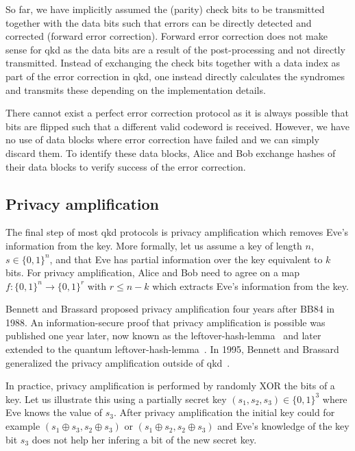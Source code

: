 So far, we have implicitly assumed the (parity) check bits to be transmitted together with the data bits such that errors can be directly detected and corrected (forward error correction).
Forward error correction does not make sense for \gls{qkd} as the data bits are a result of the post-processing and not directly transmitted.
Instead of exchanging the check bits together with a data index as part of the error correction in \gls{qkd}, one instead directly calculates the syndromes and transmits these depending on the implementation details.

There cannot exist a perfect error correction protocol as it is always possible that bits are flipped such that a different valid codeword is received.
However, we have no use of data blocks where error correction have failed and we can simply discard them.
To identify these data blocks, Alice and Bob exchange hashes of their data blocks to verify success of the error correction.

\FloatBarrier
\subsection{Privacy amplification}

The final step of most \gls{qkd} protocols is privacy amplification which removes Eve's information from the key.
More formally, let us assume a key of length $n$, $s\in\{0,1\}^n$, and that Eve has partial information over the key equivalent to $k$ bits.
For privacy amplification, Alice and Bob need to agree on a map $f\colon\{0,1\}^n\to\{0,1\}^r$ with $r\leq n-k$ which extracts Eve's information from the key.

Bennett and Brassard proposed privacy amplification four years after BB84 in 1988.
An information-secure proof that privacy amplification is possible was published one year later, now known as the leftover-hash-lemma~\cite{Impagliazzo1989} and later extended to the quantum leftover-hash-lemma~\cite{Renner2005}.
In 1995, Bennett and Brassard generalized the privacy amplification outside of \gls{qkd}~\cite{Bennett1995}.

In practice, privacy amplification is performed by randomly XOR the bits of a key.
Let us illustrate this using a partially secret key $(s_1,s_2,s_3)\in\{0,1\}^3$ where Eve knows the value of $s_3$.
After privacy amplification the initial key could for example $(s_1\oplus s_3,s_2\oplus s_3)$ or $(s_1\oplus s_2,s_2\oplus s_3)$ and Eve's knowledge of the key bit $s_3$ does not help her infering a bit of the new secret key.

